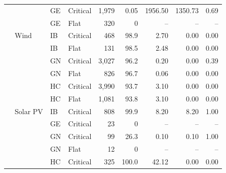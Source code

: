 \begin{longtable}{@{}l l l l r r r r r@{}}
 &  & GE & Critical & 1,979 & 0.05 & 1956.50 & 1350.73 & 0.69 \\
 &  & GE & Flat & 320 & 0 & -- & -- & -- \\
\addlinespace
 & Wind & IB & Critical & 468 & 98.9 & 2.70 & 0.00 & 0.00 \\
 &  & IB & Flat & 131 & 98.5 & 2.48 & 0.00 & 0.00 \\
 &  & GN & Critical & 3,027 & 96.2 & 0.20 & 0.00 & 0.39 \\
 &  & GN & Flat & 826 & 96.7 & 0.06 & 0.00 & 0.00 \\
 &  & HC & Critical & 3,990 & 93.7 & 3.10 & 0.00 & 0.00 \\
 &  & HC & Flat & 1,081 & 93.8 & 3.10 & 0.00 & 0.00 \\
\addlinespace
 & Solar PV & IB & Critical & 808 & 99.9 & 8.20 & 8.20 & 1.00 \\
 &  & GE & Critical & 23 & 0 & -- & -- & -- \\
 &  & GN & Critical & 99 & 26.3 & 0.10 & 0.10 & 1.00 \\
 &  & GN & Flat & 12 & 0 & -- & -- & -- \\
 &  & HC & Critical & 325 & 100.0 & 42.12 & 0.00 & 0.00 \\
\end{longtable}
\normalsize
